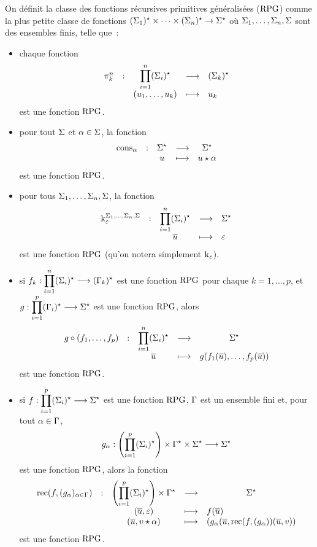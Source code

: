 \begin{definition}
  On définit la classe des fonctions récursives primitives généralisées
  ($\operatorname{RPG}$) comme la plus petite classe de fonctions
  $(\Sigma_{1})^{\star}\times\cdots\times(\Sigma_{n})^{\star}\to \Sigma^{\star}$ où
  $\Sigma_1,\ldots,\Sigma_n,\Sigma$ sont des ensembles finis, telle que~:
  \begin{itemize}
  \item chaque fonction
    \[\makeFun{\projP{k}{n}}{\prod_{i = 1}^n\toStAP{i}}{\toStAP{k}}
              {(\varwd_1,\ldots,\varwd_k)}{\varwd_k}\]
    est une fonction $\operatorname{RPG}$.
  \item pour tout $\Sigma$ et $\alpha \in \Sigma$, la fonction
    \[\makeFun{\consP{\varla}}{\toStA}{\toStA}{\varwd}{\varwd\wdPt\varla}\]
    est une fonction $\operatorname{RPG}$.
  \item pour tous $\Sigma_1,\ldots,\Sigma_n,\Sigma$, la fonction
    \[
    \makeFun{\csKP{\Ewd}{\ABA_1,\ldots,\ABA_n,\ABA}}
            {\prod_{i = 1}^n\toStAP{i}}{\toStA}{\vec\varwd}{\Ewd}
            \]
    est une fonction $\operatorname{RPG}$ (qu'on notera simplement $\operatorname{k}_{\varepsilon}$).
  \item si $f_k : \displaystyle \prod_{i = 1}^n (\Sigma_{i})^{\star} \longrightarrow (\Gamma_{k})^{\star}$ est une
    fonction $\operatorname{RPG}$ pour chaque $k = 1,\ldots,p$, et
    $g : \displaystyle \prod_{i = 1}^p(\Gamma_{i})^{\star} \longrightarrow \Sigma^{\star}$ est une fonction $\operatorname{RPG}$,
    alors
    \[\makeFun{g\circ (f_1,\ldots,f_p)}{\prod_{i = 1}^n\toStAP{i} }{\toStA}
              {\vec{\varwd}}{g(f_1(\vec{\varwd}),\ldots,f_p(\vec{\varwd}))}\]
    est une fonction $\operatorname{RPG}$.
  \item si $f : \displaystyle \prod_{i = 1}^p (\Sigma_{i})^{\star} \longrightarrow \Sigma^{\star}$ est une
    fonction $\operatorname{RPG}$, $\Gamma$ est un ensemble fini et, pour tout $\alpha\in \Gamma$,
    \[g_{\alpha} : \displaystyle \left(\prod_{i = 1}^p(\Sigma_{i})^{\star}\right)
                    \times\Gamma^{\star}\times\Sigma^{\star} \longrightarrow \Sigma^{\star}\]
    est une fonction $\operatorname{RPG}$, alors la fonction
    \[\makeFunBis{\rec(f,(g_{\varla})_{\varla \in \ABB})}
                 {\left(\prod_{i = 1}^p \toStAP{i}\right) \times\toStB}
                 {\toStA}
                 {(\vec\varwd,\Ewd)}{f(\vec\varwd)}
                 {(\vec\varwd,\varwv\wdPt\varla)}
                 {(g_{\varla}(\vec\varwd,\rec(f,(g_{\varla}))
                   (\vec\varwd,\varwv))}\]
    est une fonction $\operatorname{RPG}$.
  \end{itemize}
\end{definition}

